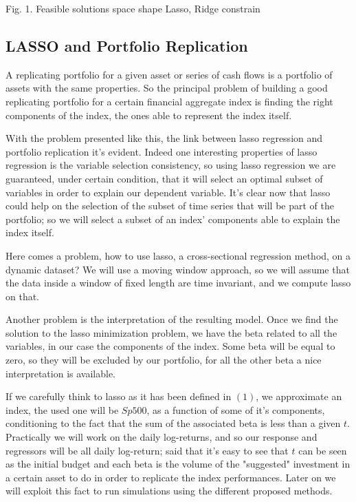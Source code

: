 \documentclass{article}%
\begin{document}
\begin{center}
\begin{small}
Fig. 1. Feasible solutions space shape Lasso, Ridge constrain
\end{small}
\end{center}

\subsection{LASSO and Portfolio Replication}

A replicating portfolio for a given asset or series of cash flows is a portfolio of assets with the same properties. So the principal problem of building a good replicating portfolio for a certain financial aggregate index is finding the right components of the index, the ones able to represent the index itself. 

With the problem presented like this, the link between lasso regression and portfolio replication it's evident. Indeed one interesting properties of lasso regression is the variable selection consistency, so using lasso regression we are guaranteed, under certain condition, that it will select an optimal subset of variables in order to explain our dependent variable. It's clear now that lasso could help on the selection of the subset of time series that will be part of the portfolio; so we will select a subset of an index' components  able to explain the index itself.


Here comes a problem, how to use lasso, a cross-sectional regression method, on a dynamic dataset? We will use a moving window approach, so we will assume that the data inside a window of fixed length are time invariant, and we compute lasso on that.

Another problem is the interpretation of the resulting model. Once we find the solution to the lasso minimization problem, we have the beta related to all the variables, in our case the components of the index. Some beta will be equal to zero, so they will be excluded by our portfolio, for all the other beta a nice interpretation is available. 

If we carefully think to lasso as it has been defined in $(1)$, we approximate an index, the used one will be $Sp500$, as a function of some of it's components, conditioning to the fact that the sum of the associated beta is less than a given $t$. Practically we will work on the daily log-returns, and so our response and regressors will be all daily log-return; said that it's easy to see that $t$ can be seen as the initial budget and each beta is the volume of the "suggested" investment in a certain asset to do in order to replicate the index performances. Later on we will exploit this fact to run simulations using the different proposed methods.
\end{document}
